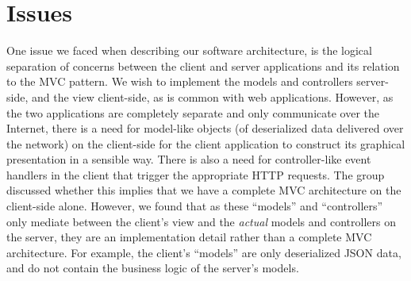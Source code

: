 \section{Issues}


One issue we faced when describing our software architecture, is the logical separation of concerns between the client and server applications and its relation to the MVC pattern. We wish to implement the models and controllers server-side, and the view client-side, as is common with web applications. However, as the two applications are completely separate and only communicate over the Internet, there is a need for model-like objects (of deserialized data delivered over the network) on the client-side for the client application to construct its graphical presentation in a sensible way. There is also a need for controller-like event handlers in the client that trigger the appropriate HTTP requests. The group discussed whether this implies that we have a complete MVC architecture on the client-side alone. However, we found that as these ``models'' and ``controllers'' only mediate between the client's view and the \emph{actual} models and controllers on the server, they are an implementation detail rather than a complete MVC architecture. For example, the client's ``models'' are only deserialized JSON data, and do not contain the business logic of the server's models.